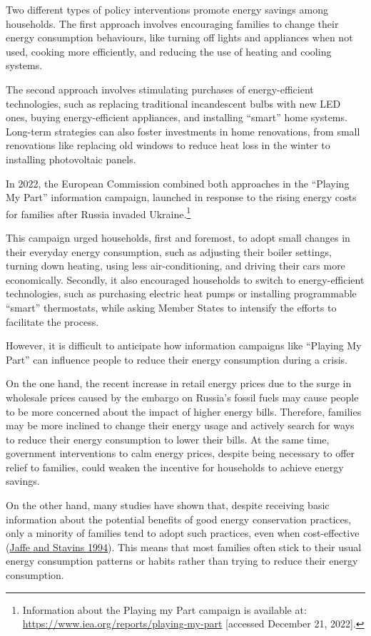 \documentclass[
  12pt,
  captions=heading]{scrreport}
\begin{document}
Two different types of policy interventions promote energy savings among
households. The first approach involves encouraging families to change
their energy consumption behaviours, like turning off lights and
appliances when not used, cooking more efficiently, and reducing the use
of heating and cooling systems.

The second approach involves stimulating purchases of energy-efficient
technologies, such as replacing traditional incandescent bulbs with new
LED ones, buying energy-efficient appliances, and installing ``smart''
home systems. Long-term strategies can also foster investments in home
renovations, from small renovations like replacing old windows to reduce
heat loss in the winter to installing photovoltaic panels.

In 2022, the European Commission combined both approaches in the
``Playing My Part'' information campaign, launched in response to the
rising energy costs for families after Russia invaded
Ukraine.\footnote{Information about the Playing my Part campaign is
  available at: \url{https://www.iea.org/reports/playing-my-part}
  {[}accessed December 21, 2022{]}.}

This campaign urged households, first and foremost, to adopt small
changes in their everyday energy consumption, such as adjusting their
boiler settings, turning down heating, using less air-conditioning, and
driving their cars more economically. Secondly, it also encouraged
households to switch to energy-efficient technologies, such as
purchasing electric heat pumps or installing programmable ``smart''
thermostats, while asking Member States to intensify the efforts to
facilitate the process.

However, it is difficult to anticipate how information campaigns like
``Playing My Part'' can influence people to reduce their energy
consumption during a crisis.

On the one hand, the recent increase in retail energy prices due to the
surge in wholesale prices caused by the embargo on Russia's fossil fuels
may cause people to be more concerned about the impact of higher energy
bills. Therefore, families may be more inclined to change their energy
usage and actively search for ways to reduce their energy consumption to
lower their bills. At the same time, government interventions to calm
energy prices, despite being necessary to offer relief to families,
could weaken the incentive for households to achieve energy savings.

On the other hand, many studies have shown that, despite receiving basic
information about the potential benefits of good energy conservation
practices, only a minority of families tend to adopt such practices,
even when cost-effective (\protect\hyperlink{ref-jaffe1994energy}{Jaffe
and Stavins 1994}). This means that most families often stick to their
usual energy consumption patterns or habits rather than trying to reduce
their energy consumption.
\end{document}
